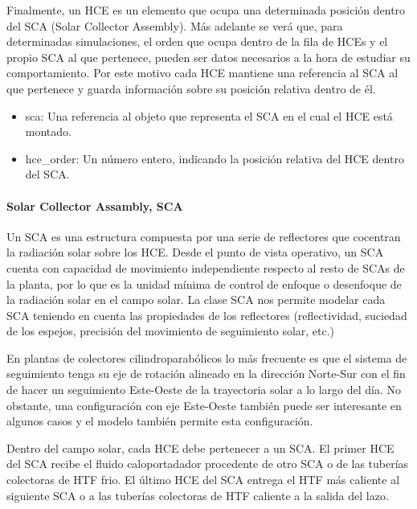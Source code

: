 Finalmente, un HCE es un elemento que ocupa una determinada posición
dentro del SCA (Solar Collector Assembly). Más adelante se verá que,
para determinadas simulaciones, el orden que ocupa dentro de la fila de
HCEs y el propio SCA al que pertenece, pueden ser datos necesarios a la
hora de estudiar su comportamiento. Por este motivo cada HCE mantiene
una referencia al SCA al que pertenece y guarda información sobre su
posición relativa dentro de él.

\begin{itemize}
\tightlist
\item
  sca: Una referencia al objeto que representa el SCA en el cual el HCE
  está montado.
\item
  hce\_order: Un número entero, indicando la posición relativa del HCE
  dentro del SCA.
\end{itemize}

\hypertarget{solar-collector-assambly-sca}{%
\paragraph{Solar Collector Assambly,
SCA}\label{solar-collector-assambly-sca}}

Un SCA es una estructura compuesta por una serie de reflectores que
cocentran la radiación solar sobre los HCE. Desde el punto de vista
operativo, un SCA cuenta con capacidad de movimiento independiente
respecto al resto de SCAs de la planta, por lo que es la unidad mínima
de control de enfoque o desenfoque de la radiación solar en el campo
solar. La clase SCA nos permite modelar cada SCA teniendo en cuenta las
propiedades de los reflectores (reflectividad, suciedad de los espejos,
precisión del movimiento de seguimiento solar, etc.)

En plantas de colectores cilindroparabólicos lo más frecuente es que el
sistema de seguimiento tenga su eje de rotación alineado en la dirección
Norte-Sur con el fin de hacer un seguimiento Este-Oeste de la
trayectoria solar a lo largo del día. No obstante, una configuración con
eje Este-Oeste también puede ser interesante en algunos casos y el
modelo también permite esta configuración.

Dentro del campo solar, cada HCE debe pertenecer a un SCA. El primer HCE
del SCA recibe el fluido caloportadador procedente de otro SCA o de las
tuberías colectoras de HTF frio. El último HCE del SCA entrega el HTF
más caliente al siguiente SCA o a las tuberías colectoras de HTF
caliente a la salida del lazo.


